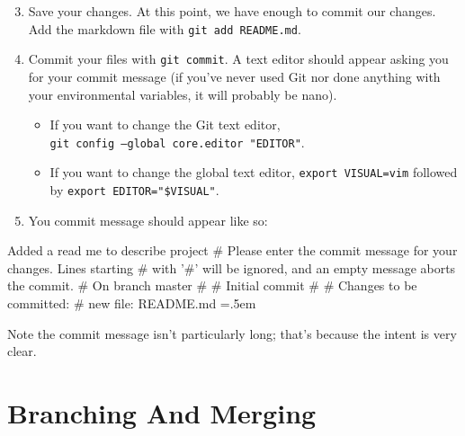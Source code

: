 \documentclass[12pt]{article}
\newenvironment{lcverbatim}
 {\SaveVerbatim{cverb}}
 {\endSaveVerbatim
  \flushleft\fboxrule=0pt\fboxsep=.5em
  \scriptsize
  \colorbox{cverbbg}{%
    \makebox[\dimexpr\linewidth-2\fboxsep][l]{\BUseVerbatim{cverb}}%
  }
  \endflushleft
}
\newcommand{\shellcmd}[1]{\texttt{\colorbox{gray!30}{#1}}}
\begin{document}
\begin{enumerate}
    \setcounter{enumi}{2}
    \item Save your changes. At this point, we have enough to commit our changes. Add the markdown file with \shellcmd{git add README.md}.
    \item Commit your files with \shellcmd{git commit}. A text editor should appear asking you for your commit message (if you've never used Git nor done anything with your environmental variables, it will probably be nano).
    \begin{itemize}
        \item If you want to change the Git text editor, \\ \shellcmd{git config --global core.editor "EDITOR"}.
        \item If you want to change the global text editor, \shellcmd{export VISUAL=vim} followed by \shellcmd{export EDITOR="\$VISUAL"}.
    \end{itemize}

    \item You commit message should appear like so:
\end{enumerate}

\begin{lcverbatim}
Added a read me to describe project
# Please enter the commit message for your changes. Lines starting
# with '#' will be ignored, and an empty message aborts the commit.
# On branch master
#
# Initial commit
#
# Changes to be committed:
#       new file:   README.md
\end{lcverbatim}

\noindent Note the commit message isn't particularly long; that's because the intent is very clear.

\section{Branching And Merging}
\end{document}
